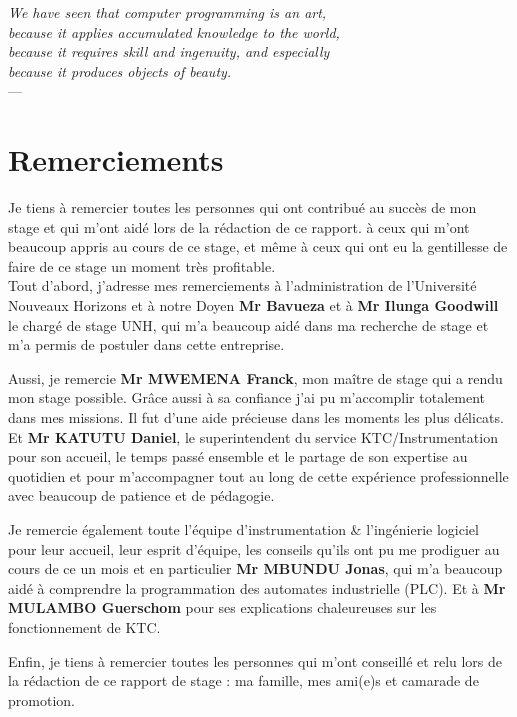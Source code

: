 

\begin{flushright}{\slshape    
We have seen that computer programming is an art, \\ 
because it applies accumulated knowledge to the world, \\ 
because it requires skill and ingenuity, and especially \\
because it produces objects of beauty.} \\ \medskip
---  \citep{knuth:1974}
\end{flushright}



\bigskip


\begingroup

\let\clearpage\relax
\let\cleardoublepage\relax
\let\cleardoublepage\relax
\chapter*{Remerciements}

Je tiens à remercier toutes les personnes qui ont contribué au succès de mon stage et qui m'ont aidé lors de la rédaction de ce rapport. à ceux qui m’ont beaucoup appris au cours de ce stage, et même à ceux qui ont eu la gentillesse de faire de ce stage un moment très profitable.\\
Tout d'abord, j'adresse mes remerciements à l’administration de l’Université Nouveaux Horizons et à notre Doyen \textbf{Mr Bavueza} et à \textbf{Mr Ilunga Goodwill} le chargé de stage UNH, qui m'a beaucoup aidé dans ma recherche de stage et m'a permis de postuler dans cette entreprise.

Aussi, je remercie \textbf{Mr MWEMENA Franck}, mon maître de stage qui a rendu mon stage possible. Grâce aussi à sa confiance j'ai pu m'accomplir totalement dans mes missions. Il fut d'une aide précieuse dans les moments les plus délicats. Et \textbf{Mr KATUTU Daniel}, le superintendent du service KTC/Instrumentation pour son accueil, le temps passé ensemble et le partage de son expertise au quotidien et pour m'accompagner tout au long de cette expérience professionnelle avec beaucoup de patience et de pédagogie.

Je remercie également toute l'équipe d’instrumentation \& l'ingénierie logiciel pour leur accueil, leur esprit d'équipe, les conseils qu’ils ont pu me prodiguer au cours de ce un mois et en particulier \textbf{Mr MBUNDU Jonas}, qui m'a beaucoup aidé à comprendre la programmation des automates industrielle (PLC). Et à \textbf{Mr MULAMBO Guerschom} pour ses explications chaleureuses sur les fonctionnement de KTC.

Enfin, je tiens à remercier toutes les personnes qui m'ont conseillé et relu lors de la rédaction de ce rapport de stage : ma famille, mes ami(e)s et camarade de promotion.

\endgroup